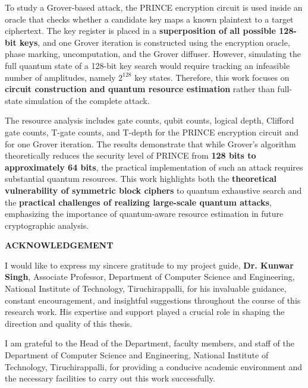 \documentclass[12pt,a4paper]{report}
\begin{document}
To study a Grover-based attack, the PRINCE encryption circuit is used inside an oracle that checks whether a candidate key maps a known plaintext to a target ciphertext. The key register is placed in a \textbf{superposition of all possible 128-bit keys}, and one Grover iteration is constructed using the encryption oracle, phase marking, uncomputation, and the Grover diffuser. However, simulating the full quantum state of a 128-bit key search would require tracking an infeasible number of amplitudes, namely \textbf{$2^{128}$} key states. Therefore, this work focuses on \textbf{circuit construction and quantum resource estimation} rather than full-state simulation of the complete attack.

The resource analysis includes gate counts, qubit counts, logical depth, Clifford gate counts, T-gate counts, and T-depth for the PRINCE encryption circuit and for one Grover iteration. The results demonstrate that while Grover's algorithm theoretically reduces the security level of PRINCE from \textbf{128 bits to approximately 64 bits}, the practical implementation of such an attack requires substantial quantum resources. This work highlights both the \textbf{theoretical vulnerability of symmetric block ciphers} to quantum exhaustive search and the \textbf{practical challenges of realizing large-scale quantum attacks}, emphasizing the importance of quantum-aware resource estimation in future cryptographic analysis.



\cleardoublepage
\setcounter{page}{4}
\doublespacing

\begin{center}
\textbf{ACKNOWLEDGEMENT}
\end{center}

\vspace{2\baselineskip}

I would like to express my sincere gratitude to my project guide, \textbf{Dr. Kunwar Singh}, Associate Professor, Department of Computer Science and Engineering, National Institute of Technology, Tiruchirappalli, for his invaluable guidance, constant encouragement, and insightful suggestions throughout the course of this research work. His expertise and support played a crucial role in shaping the direction and quality of this thesis.

I am grateful to the Head of the Department, faculty members, and staff of the Department of Computer Science and Engineering, National Institute of Technology, Tiruchirappalli, for providing a conducive academic environment and the necessary facilities to carry out this work successfully.
\end{document}
